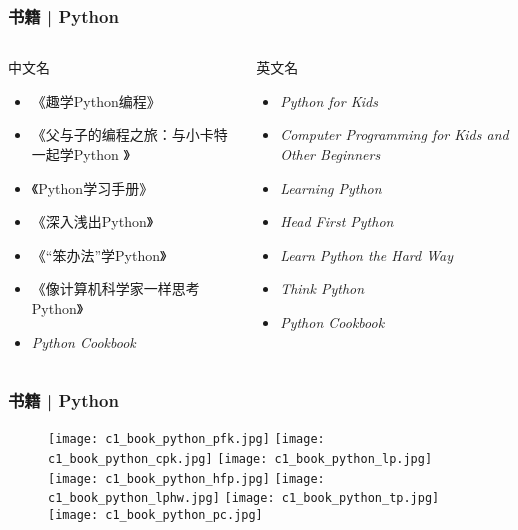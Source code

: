 \begin{frame}
  \frametitle{书籍 | Python}
  \begin{columns}
  \begin{block}{中文名}
    \begin{itemize}
      \item 《趣学Python编程》
      \item 《父与子的编程之旅：与小卡特一起学Python 》
      \item 《Python学习手册》
      \item 《深入浅出Python》
      \item 《“笨办法”学Python》
      \item 《像计算机科学家一样思考Python》
      \item \textit{Python Cookbook}
    \end{itemize}
  \end{block}
  \begin{block}{英文名}
    \begin{itemize}
      \item \textit{Python for Kids}
      \item \textit{Computer Programming for Kids and Other Beginners}
      \item \textit{Learning Python}
      \item \textit{Head First Python}
      \item \textit{Learn Python the Hard Way}
      \item \textit{Think Python}
        \vspace{1em}
      \item \textit{Python Cookbook}
    \end{itemize}
  \end{block}
\end{columns}
\end{frame}

\begin{frame}
  \frametitle{书籍 | Python}
  \begin{figure}
    \centering
    \texttt{[image: c1\_book\_python\_pfk.jpg]}\quad
    \texttt{[image: c1\_book\_python\_cpk.jpg]}\quad
    \texttt{[image: c1\_book\_python\_lp.jpg]}\\
    \texttt{[image: c1\_book\_python\_hfp.jpg]}\quad
    \texttt{[image: c1\_book\_python\_lphw.jpg]}\quad
    \texttt{[image: c1\_book\_python\_tp.jpg]}\quad
    \texttt{[image: c1\_book\_python\_pc.jpg]}
  \end{figure}
\end{frame}

